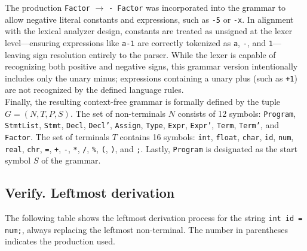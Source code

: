 \documentclass[12pt,letterpaper]{article}
\begin{document}
The production \texttt{Factor} $\rightarrow$ \texttt{- Factor} was incorporated into the grammar to allow negative literal constants and expressions, such as \texttt{-5} or \texttt{-x}. In alignment with the lexical analyzer design, constants are treated as unsigned at the lexer level---ensuring expressions like \texttt{a-1} are correctly tokenized as \texttt{a}, \texttt{-}, and \texttt{1}---leaving sign resolution entirely to the parser. While the lexer is capable of recognizing both positive and negative signs, this grammar version intentionally includes only the unary minus; expressions containing a unary plus (such as \texttt{+1}) are not recognized by the defined language rules.\\

Finally, the resulting context-free grammar is formally defined by the tuple $G = (N, T, P, S)$. The set of non-terminals $N$ consists of 12 symbols: \texttt{Program}, \texttt{StmtList}, \texttt{Stmt}, \texttt{Decl}, \texttt{Decl'}, \texttt{Assign}, \texttt{Type}, \texttt{Expr}, \texttt{Expr'}, \texttt{Term}, \texttt{Term'}, and \texttt{Factor}. The set of terminals $T$ contains 16 symbols: \texttt{int}, \texttt{float}, \texttt{char}, \texttt{id}, \texttt{num}, \texttt{real}, \texttt{chr}, \texttt{=}, \texttt{+}, \texttt{-}, \texttt{*}, \texttt{/}, \texttt{\%}, \texttt{(}, \texttt{)}, and \texttt{;}. Lastly, \texttt{Program} is designated as the start symbol $S$ of the grammar.\\
\newpage

\subsection{Verify. Leftmost derivation}

The following table shows the leftmost derivation process for the string \texttt{int id = num;}, always replacing the leftmost non-terminal. The number in parentheses indicates the production used.
\end{document}
